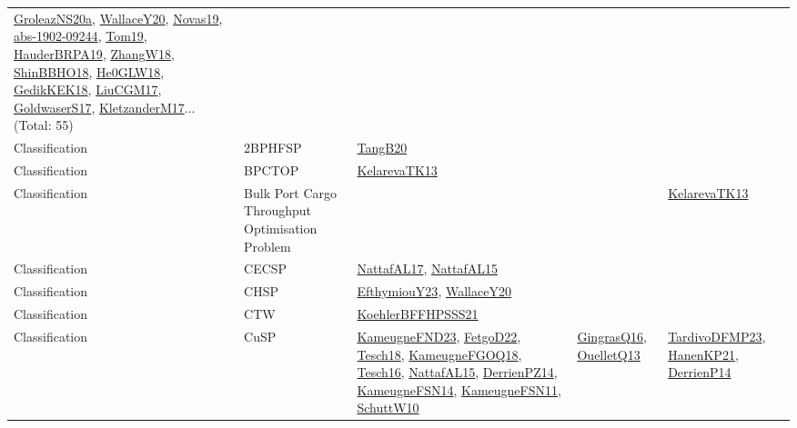{\begin{longtable}{lp{3cm}>{\raggedright}p{6cm}>{\raggedright}p{6cm}p{8cm}}
\href{papers/GroleazNS20a.pdf}{GroleazNS20a}\cite{GroleazNS20a}, \href{articles/WallaceY20.pdf}{WallaceY20}\cite{WallaceY20}, \href{articles/Novas19.pdf}{Novas19}\cite{Novas19}, \href{articles/abs-1902-09244.pdf}{abs-1902-09244}\cite{abs-1902-09244}, \href{papers/Tom19.pdf}{Tom19}\cite{Tom19}, \href{articles/HauderBRPA19.pdf}{HauderBRPA19}\cite{HauderBRPA19}, \href{articles/ZhangW18.pdf}{ZhangW18}\cite{ZhangW18}, \href{articles/ShinBBHO18.pdf}{ShinBBHO18}\cite{ShinBBHO18}, \href{papers/He0GLW18.pdf}{He0GLW18}\cite{He0GLW18}, \href{articles/GedikKEK18.pdf}{GedikKEK18}\cite{GedikKEK18}, \href{papers/LiuCGM17.pdf}{LiuCGM17}\cite{LiuCGM17}, \href{papers/GoldwaserS17.pdf}{GoldwaserS17}\cite{GoldwaserS17}, \href{papers/KletzanderM17.pdf}{KletzanderM17}\cite{KletzanderM17}... (Total: 55)\\
Classification & 2BPHFSP & \href{papers/TangB20.pdf}{TangB20}\cite{TangB20} &  & \\
Classification & BPCTOP & \href{papers/KelarevaTK13.pdf}{KelarevaTK13}\cite{KelarevaTK13} &  & \\
Classification & Bulk Port Cargo Throughput Optimisation Problem &  &  & \href{papers/KelarevaTK13.pdf}{KelarevaTK13}\cite{KelarevaTK13}\\
Classification & CECSP & \href{articles/NattafAL17.pdf}{NattafAL17}\cite{NattafAL17}, \href{articles/NattafAL15.pdf}{NattafAL15}\cite{NattafAL15} &  & \\
Classification & CHSP & \href{papers/EfthymiouY23.pdf}{EfthymiouY23}\cite{EfthymiouY23}, \href{articles/WallaceY20.pdf}{WallaceY20}\cite{WallaceY20} &  & \\
Classification & CTW & \href{articles/KoehlerBFFHPSSS21.pdf}{KoehlerBFFHPSSS21}\cite{KoehlerBFFHPSSS21} &  & \\
Classification & CuSP & \href{papers/KameugneFND23.pdf}{KameugneFND23}\cite{KameugneFND23}, \href{articles/FetgoD22.pdf}{FetgoD22}\cite{FetgoD22}, \href{papers/Tesch18.pdf}{Tesch18}\cite{Tesch18}, \href{papers/KameugneFGOQ18.pdf}{KameugneFGOQ18}\cite{KameugneFGOQ18}, \href{papers/Tesch16.pdf}{Tesch16}\cite{Tesch16}, \href{articles/NattafAL15.pdf}{NattafAL15}\cite{NattafAL15}, \href{papers/DerrienPZ14.pdf}{DerrienPZ14}\cite{DerrienPZ14}, \href{articles/KameugneFSN14.pdf}{KameugneFSN14}\cite{KameugneFSN14}, \href{papers/KameugneFSN11.pdf}{KameugneFSN11}\cite{KameugneFSN11}, \href{papers/SchuttW10.pdf}{SchuttW10}\cite{SchuttW10} & \href{papers/GingrasQ16.pdf}{GingrasQ16}\cite{GingrasQ16}, \href{papers/OuelletQ13.pdf}{OuelletQ13}\cite{OuelletQ13} & \href{papers/TardivoDFMP23.pdf}{TardivoDFMP23}\cite{TardivoDFMP23}, \href{papers/HanenKP21.pdf}{HanenKP21}\cite{HanenKP21}, \href{papers/DerrienP14.pdf}{DerrienP14}\cite{DerrienP14}\\

\end{longtable}}
